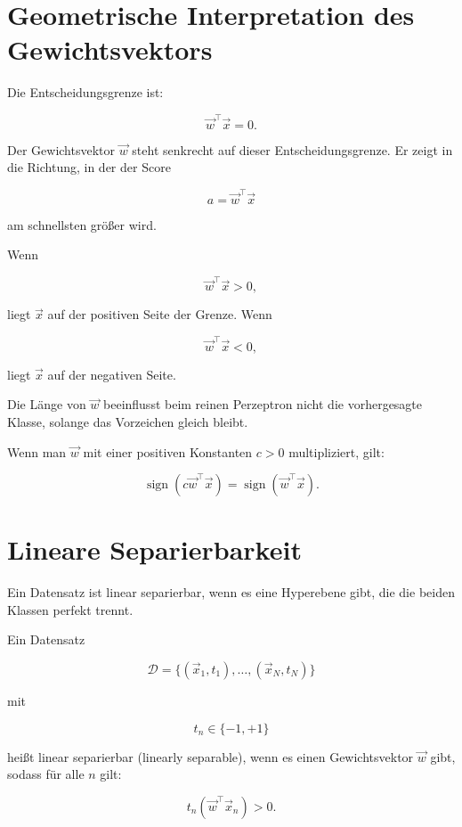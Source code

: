\section{Geometrische Interpretation des Gewichtsvektors}

Die Entscheidungsgrenze ist:

\[
    \vec{w}^{\top}\vec{x}=0.
\]

Der Gewichtsvektor \(\vec{w}\) steht senkrecht auf dieser Entscheidungsgrenze.
Er zeigt in die Richtung, in der der Score

\[
    a
    =
    \vec{w}^{\top}\vec{x}
\]

am schnellsten größer wird.

Wenn

\[
    \vec{w}^{\top}\vec{x} > 0,
\]

liegt \(\vec{x}\) auf der positiven Seite der Grenze.
Wenn

\[
    \vec{w}^{\top}\vec{x} < 0,
\]

liegt \(\vec{x}\) auf der negativen Seite.

\begin{notebox}
Die Länge von \(\vec{w}\) beeinflusst beim reinen Perzeptron nicht die vorhergesagte Klasse, solange das Vorzeichen gleich bleibt.

Wenn man \(\vec{w}\) mit einer positiven Konstanten \(c>0\) multipliziert, gilt:

\[
    \operatorname{sign}(c\vec{w}^{\top}\vec{x})
    =
    \operatorname{sign}(\vec{w}^{\top}\vec{x}).
\]
\end{notebox}

\section{Lineare Separierbarkeit}

Ein Datensatz ist linear separierbar, wenn es eine Hyperebene gibt, die die beiden Klassen perfekt trennt.

\begin{definitionbox}
Ein Datensatz

\[
    \mathcal{D}
    =
    \{(\vec{x}_1,t_1),\dots,(\vec{x}_N,t_N)\}
\]

mit

\[
    t_n \in \{-1,+1\}
\]

heißt linear separierbar (linearly separable), wenn es einen Gewichtsvektor \(\vec{w}\) gibt, sodass für alle \(n\) gilt:

\[
    t_n(\vec{w}^{\top}\vec{x}_n) > 0.
\]
\end{definitionbox}

